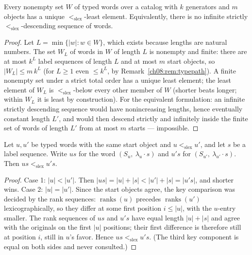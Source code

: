 \begin{lemma}\label{ch08:lem:wellfounded}
Every nonempty set $W$ of typed words over a catalog with $k$ generators
and $m$ objects has a unique $<_{\mathrm{slex}}$-least element. Equivalently,
there is no infinite strictly $<_{\mathrm{slex}}$-descending sequence of
words.
\end{lemma}

\begin{proof}
Let $L=\min\{|w| : w\in W\}$, which exists because lengths are natural
numbers. The set $W_L$ of words in $W$ of length $L$ is nonempty and
finite: there are at most $k^L$ label sequences of length $L$ and at most
$m$ start objects, so $|W_L|\le m\,k^L$ (for $L\ge 1$ even $\le k^L$, by
Remark~\ref{ch08:rem:typepath}). A finite nonempty set under a strict total
order has a unique least element; the least element of $W_L$ is
$<_{\mathrm{slex}}$-below every other member of $W$ (shorter beats longer;
within $W_L$ it is least by construction). For the equivalent formulation:
an infinite strictly descending sequence would have nonincreasing lengths,
hence eventually constant length $L'$, and would then descend strictly and
infinitely inside the finite set of words of length $L'$ from at most $m$
starts --- impossible.
\end{proof}

\begin{lemma}\label{ch08:lem:append}
Let $u,u'$ be typed words with the same start object and
$u<_{\mathrm{slex}}u'$, and let $s$ be a label sequence. Write $us$ for the
word $(S_u,\ \lambda_u\!\cdot\! s)$ and $u's$ for
$(S_{u'},\ \lambda_{u'}\!\cdot\! s)$. Then $us<_{\mathrm{slex}}u's$.
\end{lemma}

\begin{proof}
Case 1: $|u|<|u'|$. Then $|us|=|u|+|s|<|u'|+|s|=|u's|$, and shorter wins.
Case 2: $|u|=|u'|$. Since the start objects agree, the key comparison was
decided by the rank sequences: $\operatorname{ranks}(u)$ precedes
$\operatorname{ranks}(u')$ lexicographically, so they differ at some first
position $i\le|u|$, with the $u$-entry smaller. The rank sequences of $us$
and $u's$ have equal length $|u|+|s|$ and agree with the originals on the
first $|u|$ positions; their first difference is therefore still at position
$i$, still in $u$'s favor. Hence $us<_{\mathrm{slex}}u's$. (The third key
component is equal on both sides and never consulted.)
\end{proof}

